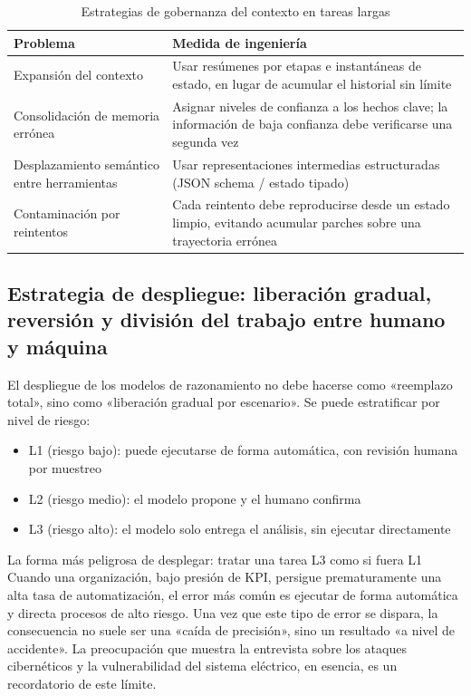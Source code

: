 \begin{table}[H]
\centering
\begin{tabular}{lp{8.7cm}}
\toprule
\textbf{Problema} & \textbf{Medida de ingeniería} \\
\midrule
Expansión del contexto & Usar resúmenes por etapas e instantáneas de estado, en lugar de acumular el historial sin límite \\
Consolidación de memoria errónea & Asignar niveles de confianza a los hechos clave; la información de baja confianza debe verificarse una segunda vez \\
Desplazamiento semántico entre herramientas & Usar representaciones intermedias estructuradas (JSON schema / estado tipado) \\
Contaminación por reintentos & Cada reintento debe reproducirse desde un estado limpio, evitando acumular parches sobre una trayectoria errónea \\
\bottomrule
\end{tabular}
\caption{Estrategias de gobernanza del contexto en tareas largas}
\end{table}

\subsection{Estrategia de despliegue: liberación gradual, reversión y división del trabajo entre humano y máquina}

El despliegue de los modelos de razonamiento no debe hacerse como «reemplazo total», sino como «liberación gradual por escenario». Se puede estratificar por nivel de riesgo:
\begin{itemize}
    \item L1 (riesgo bajo): puede ejecutarse de forma automática, con revisión humana por muestreo
    \item L2 (riesgo medio): el modelo propone y el humano confirma
    \item L3 (riesgo alto): el modelo solo entrega el análisis, sin ejecutar directamente
\end{itemize}

\begin{warningbox}{La forma más peligrosa de desplegar: tratar una tarea L3 como si fuera L1}
Cuando una organización, bajo presión de KPI, persigue prematuramente una alta tasa de automatización, el error más común es ejecutar de forma automática y directa procesos de alto riesgo. Una vez que este tipo de error se dispara, la consecuencia no suele ser una «caída de precisión», sino un resultado «a nivel de accidente». La preocupación que muestra la entrevista sobre los ataques cibernéticos y la vulnerabilidad del sistema eléctrico, en esencia, es un recordatorio de este límite.
\end{warningbox}

